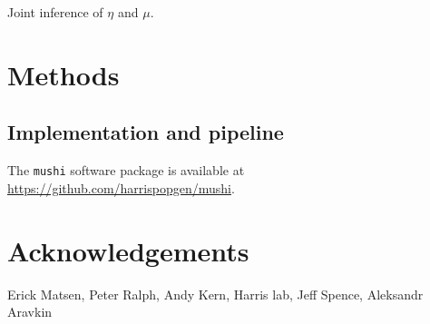 \documentclass[11pt]{article}
\begin{document}
Joint inference of $\eta$ and $\mu$.


\section*{Methods}\label{sec:methods}

\subsection*{Implementation and pipeline}\label{sec:methods:tool}

The \texttt{mushi} software package is available at \url{https://github.com/harrispopgen/mushi}.

\section*{Acknowledgements}\label{sec:ack}

Erick Matsen, Peter Ralph, Andy Kern, Harris lab, Jeff Spence, Aleksandr Aravkin





\appendix

\end{document}

